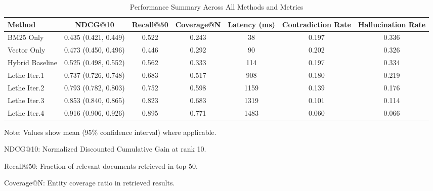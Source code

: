 \begin{table*}[htbp]
\centering
\caption{Performance Summary Across All Methods and Metrics}
\label{tab:performance-summary}
\begin{tabular}{lcccccc}
\toprule
Method & NDCG@10 & Recall@50 & Coverage@N & Latency (ms) & Contradiction Rate & Hallucination Rate \\
\midrule
BM25 Only & 0.435 (0.421, 0.449) & 0.522 & 0.243 & 38 & 0.197 & 0.336 \\
Vector Only & 0.473 (0.450, 0.496) & 0.446 & 0.292 & 90 & 0.202 & 0.326 \\
Hybrid Baseline & 0.525 (0.498, 0.552) & 0.562 & 0.333 & 114 & 0.197 & 0.334 \\
Lethe Iter.1 & 0.737 (0.726, 0.748) & 0.683 & 0.517 & 908 & 0.180 & 0.219 \\
Lethe Iter.2 & 0.793 (0.782, 0.803) & 0.752 & 0.598 & 1159 & 0.139 & 0.176 \\
Lethe Iter.3 & 0.853 (0.840, 0.865) & 0.823 & 0.683 & 1319 & 0.101 & 0.114 \\
Lethe Iter.4 & 0.916 (0.906, 0.926) & 0.895 & 0.771 & 1483 & 0.060 & 0.066 \\
\bottomrule
\end{tabular}
\begin{tablenotes}
\small
\item Note: Values show mean (95\% confidence interval) where applicable. 
\item NDCG@10: Normalized Discounted Cumulative Gain at rank 10.
\item Recall@50: Fraction of relevant documents retrieved in top 50.
\item Coverage@N: Entity coverage ratio in retrieved results.
\end{tablenotes}
\end{table*}
